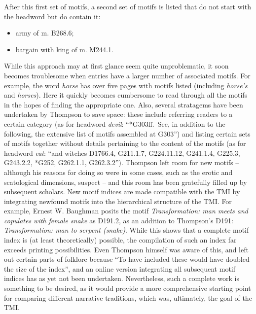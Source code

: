 After this first set of motifs, a second set of motifs is listed that do not start with the
headword but do contain it:
\begin{itemize}
    \item army of m. B268.6;
    \item bargain with king of m. M244.1.
\end{itemize}
While this approach may at first glance seem quite unproblematic, it soon becomes troublesome when entries have a larger number of associated motifs. For example, the word \emph{horse} has over five pages with motifs listed (including \emph{horse's} and \emph{horses}). Here it quickly becomes cumbersome to read through all the motifs in the hopes of finding the appropriate one. Also, several stratagems have been undertaken by Thompson to save space: these include referring readers to a certain category (as for headword \emph{devil}: ``*G303ff.\ See, in addition to the following, the extensive list of motifs assembled at G303'') and listing certain sets of motifs together without details pertaining to the content of the motifs (as for headword \emph{cat}: ``and witches D1766.4, G211.1.7, G224.11.12, G241.1.4, G225.3, G243.2.2, *G252, G262.1.1, G262.3.2''). Thompson left room for new motifs -- although his reasons for doing so were in some cases, such as the erotic and scatological dimensions, suspect\autocite{legman:1962} -- and this room has been gratefully filled up by subsequent scholars. New motif indices are made compatible with the TMI by integrating newfound motifs into the hierarchical structure of the TMI. For example, Ernest W. Baughman\autocite{baughman:1966} posits the motif \emph{Transformation: man meets and copulates with female snake} as D191.2, as an addition to Thompson's D191: \emph{Transformation: man to serpent (snake)}. While this shows that a complete motif index is (at least theoretically) possible, the compilation of such an index far exceeds printing possibilities. Even Thompson himself was aware of this, and left out certain parts of folklore because ``To have included these would have doubled the size of the index''\autocite[11]{thompson:1955}, and an online version integrating all subsequent motif indices has as yet not been undertaken. Nevertheless, such a complete work is something to be desired, as it would provide a more comprehensive starting point for comparing different narrative traditions, which was, ultimately, the goal of the TMI\autocite[9--10]{thompson:1955}.


